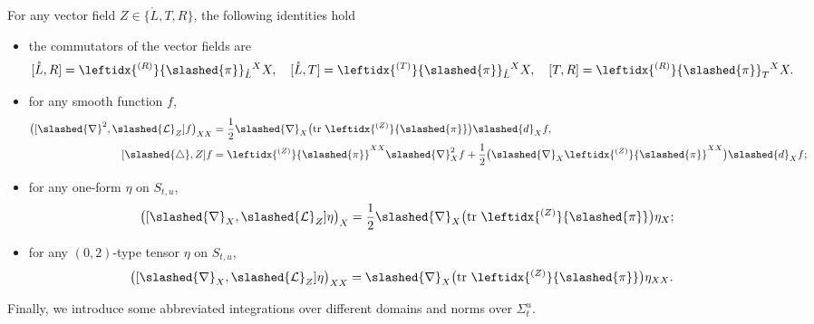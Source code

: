 \documentclass[11pt,twoside]{article}
\begin{document}
\begin{lemma}\label{com}
For any vector field $Z \in \{\mathring{L}, T, R\}$, the following identities hold

 \begin{itemize}
  \item the commutators of the vector fields are
  \begin{equation}\label{c}
  \begin{split}
  [\mathring{L}, R] &= \leftidx{^{(R)}}{\slashed{\pi}}_{\mathring{L}}{}^{X}X, \quad
  [\mathring{L}, T] = \leftidx{^{(T)}}{\slashed{\pi}}_{\mathring{L}}{}^{X}X, \quad
  [T, R] = \leftidx{^{(R)}}{\slashed{\pi}}_{T}{}^{X}X.
  \end{split}
  \end{equation}
  \item for any smooth function $f$,
  \begin{align}
  \bigl([\slashed{\nabla}^2, \slashed{\mathcal{L}}_Z]f\bigr)_{XX}
  &= \frac{1}{2} \slashed{\nabla}_X\bigl(\operatorname{tr}\,\leftidx{^{(Z)}}{\slashed{\pi}}\bigr) \slashed{d}_Xf, \label{nZf}\\
  [\slashed{\triangle}, Z]f &= \leftidx{^{(Z)}}{\slashed{\pi}}^{XX} \slashed{\nabla}_X^2f
  + \frac{1}{2} \bigl(\slashed{\nabla}_X \leftidx{^{(Z)}}{\slashed{\pi}}^{XX}\bigr) \slashed{d}_Xf; \label{LZf}
  \end{align}
  \item for any one-form $\eta$ on $S_{t, u}$,
  \begin{equation}\label{nZx}
  \bigl([\slashed{\nabla}_X, \slashed{\mathcal{L}}_Z]\eta\bigr)_X = \frac{1}{2} \slashed{\nabla}_X\bigl(\operatorname{tr}\,\leftidx{^{(Z)}}{\slashed{\pi}}\bigr) \eta_X;
  \end{equation}
  \item for any $(0,2)$-type tensor $\eta$ on $S_{t, u}$,
  \begin{align}
  \bigl([\slashed{\nabla}_X, \slashed{\mathcal{L}}_Z]\eta\bigr)_{XX}
  &= \slashed{\nabla}_X\bigl(\operatorname{tr}\,\leftidx{^{(Z)}}{\slashed{\pi}}\bigr) \eta_{XX}. \label{nZxi}
  \end{align}
 \end{itemize}
\end{lemma}
Finally, we introduce some abbreviated integrations over different domains and norms over $\Sigma_t^u$.
\end{document}
